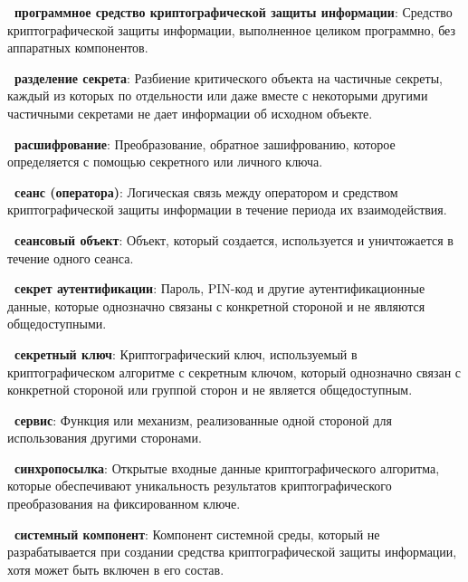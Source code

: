 {\bf \thedefctr~программное средство криптографической защиты информации}:
Средство криптографической защиты информации, выполненное целиком программно, 
без аппаратных компонентов. 

{\bf \thedefctr~разделение секрета}:
Разбиение критического объекта на частичные секреты, 
каждый из которых по отдельности или даже вместе с некоторыми
другими частичными секретами не дает информации об исходном объекте.

{\bf \thedefctr~расшифрование}:
Преобразование, обратное зашифрованию, которое определяется с помощью
секретного или личного ключа.

{\bf \thedefctr~сеанс (оператора)}:
Логическая связь между оператором и средством криптографической
защиты информации в течение периода их взаимодействия.


{\bf \thedefctr~сеансовый объект}:
Объект, который создается, 
используется и уничтожается в течение одного сеанса.

{\bf \thedefctr~секрет аутентификации}:
Пароль, PIN-код и другие аутентификационные данные, которые однозначно связаны с
конкретной стороной и не являются общедоступными.

{\bf \thedefctr~секретный ключ}:
Криптографический ключ, используемый в криптографическом алгоритме с секретным
ключом, который однозначно связан с конкретной стороной или группой сторон и не
является общедоступным.


{\bf \thedefctr~сервис}:
Функция или механизм, реализованные одной стороной для использования другими 
сторонами.

%

{\bf \thedefctr~синхропосылка}:
Открытые входные данные криптографического алгоритма,
которые обеспечивают уникальность результатов 
криптографического преобразования на фиксированном ключе.

{\bf \thedefctr~системный компонент}:
Компонент системной среды, который не разрабатывается при создании средства
криптографической защиты информации, хотя может быть включен в его состав.

